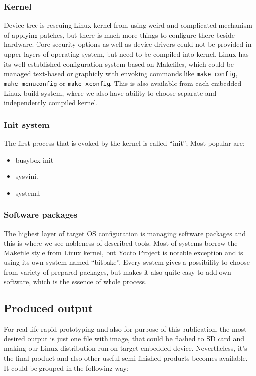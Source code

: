 \documentclass[printmode]{mgr}
\begin{document}
\subsubsection{Kernel}
Device tree is rescuing Linux kernel from using weird and complicated mechanism of applying patches, but there is much more things to configure there beside hardware. Core security options as well as device drivers could not be provided in upper layers of operating system, but need to be compiled into kernel. Linux has its well established configuration system based on Makefiles, which could be managed text-based or graphicly with envoking commands like \verb|make config|, \verb|make menuconfig| or \verb|make xconfig|. This is also available from each embedded Linux build system, where we also have ability to choose separate and independently compiled kernel.

\subsubsection{Init system}

The first process that is evoked by the kernel is called ``init''; Most popular are:

\begin{itemize}
    \item busybox-init
    \item sysvinit
    \item systemd
\end{itemize}

\subsubsection{Software packages}
The highest layer of target OS configuration is managing software packages and this is where we see nobleness of described tools. Most of systems borrow the Makefile style from Linux kernel, but Yocto Project is notable exception and is using its own system named ``bitbake''. Every system gives a possibility to choose from variety of prepared packages, but makes it also quite easy to add own software, which is the essence of whole process.

\subsection{Produced output}
For real-life rapid-prototyping and also for purpose of this publication, the most desired output is just one file with image, that could be flashed to SD card and making our Linux distribution run on target embedded device. Nevertheless, it's the final product and also other useful semi-finished products becomes available. It could be grouped in the following way:
\end{document}
